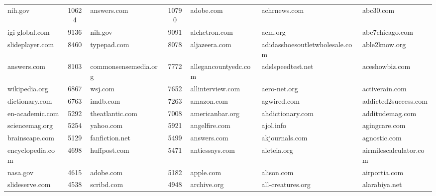 \documentclass[11pt]{article}
\begin{document}
\begin{table}[thb]
{\begin{tabular}{|lclclll|}
nih.gov & \multicolumn{1}{c|}{10624} & answers.com & \multicolumn{1}{c|}{10790} & \multicolumn{1}{l|}{{ {adobe.com}}} & \multicolumn{1}{l|}{{ {achrnews.com}}} & { {abc30.com}} \\
igi-global.com & \multicolumn{1}{c|}{9136} & nih.gov & \multicolumn{1}{c|}{9091} & \multicolumn{1}{l|}{{ {alchetron.com}}} & \multicolumn{1}{l|}{{ {acm.org}}} & { {abc7chicago.com}} \\
slideplayer.com & \multicolumn{1}{c|}{8460} & typepad.com & \multicolumn{1}{c|}{8078} & \multicolumn{1}{l|}{{ {aljazeera.com}}} & \multicolumn{1}{l|}{{ {adidasshoesoutletwholesale.com}}} & { {able2know.org}} \\
answers.com & \multicolumn{1}{c|}{8103} & commonsensemedia.org & \multicolumn{1}{c|}{7772} & \multicolumn{1}{l|}{{ {allegancountyedc.com}}} & \multicolumn{1}{l|}{{ {adslspeedtest.net}}} & { {aceshowbiz.com}} \\
wikipedia.org & \multicolumn{1}{c|}{6867} & wsj.com & \multicolumn{1}{c|}{7652} & \multicolumn{1}{l|}{{ {allinterview.com}}} & \multicolumn{1}{l|}{{ {aero-net.org}}} & { {activerain.com}} \\
dictionary.com & \multicolumn{1}{c|}{6763} & imdb.com & \multicolumn{1}{c|}{7263} & \multicolumn{1}{l|}{{ {amazon.com}}} & \multicolumn{1}{l|}{{ {agwired.com}}} & { {addicted2success.com}} \\
en-academic.com & \multicolumn{1}{c|}{5292} & theatlantic.com & \multicolumn{1}{c|}{7008} & \multicolumn{1}{l|}{{ {americanbar.org}}} & \multicolumn{1}{l|}{{ {ahdictionary.com}}} & { {additudemag.com}} \\
sciencemag.org & \multicolumn{1}{c|}{5254} & yahoo.com & \multicolumn{1}{c|}{5921} & \multicolumn{1}{l|}{{ {angelfire.com}}} & \multicolumn{1}{l|}{{ {ajol.info}}} & { {agingcare.com}} \\
brainscape.com & \multicolumn{1}{c|}{5129} & fanfiction.net & \multicolumn{1}{c|}{5499} & \multicolumn{1}{l|}{{ {answers.com}}} & \multicolumn{1}{l|}{{ {akjournals.com}}} & { {agnostic.com}} \\
encyclopedia.com & \multicolumn{1}{c|}{4698} & huffpost.com & \multicolumn{1}{c|}{5471} & \multicolumn{1}{l|}{{ {antiessays.com}}} & \multicolumn{1}{l|}{{ {aleteia.org}}} & { {airmilescalculator.com}} \\
nasa.gov & \multicolumn{1}{c|}{4615} & adobe.com & \multicolumn{1}{c|}{5182} & \multicolumn{1}{l|}{{ {apple.com}}} & \multicolumn{1}{l|}{{ {alison.com}}} & { {airportia.com}} \\
slideserve.com & \multicolumn{1}{c|}{4538} & scribd.com & \multicolumn{1}{c|}{4948} & \multicolumn{1}{l|}{{ {archive.org}}} & \multicolumn{1}{l|}{{ {all-creatures.org}}} & { {alarabiya.net}} \\

\end{tabular}}
\end{table}
\end{document}
